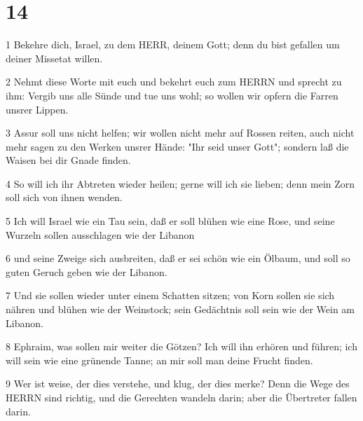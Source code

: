 \chapter{14}

\par 1 Bekehre dich, Israel, zu dem HERR, deinem Gott; denn du bist gefallen um deiner Missetat willen.
\par 2 Nehmt diese Worte mit euch und bekehrt euch zum HERRN und sprecht zu ihm: Vergib uns alle Sünde und tue uns wohl; so wollen wir opfern die Farren unsrer Lippen.
\par 3 Assur soll uns nicht helfen; wir wollen nicht mehr auf Rossen reiten, auch nicht mehr sagen zu den Werken unsrer Hände: "Ihr seid unser Gott"; sondern laß die Waisen bei dir Gnade finden.
\par 4 So will ich ihr Abtreten wieder heilen; gerne will ich sie lieben; denn mein Zorn soll sich von ihnen wenden.
\par 5 Ich will Israel wie ein Tau sein, daß er soll blühen wie eine Rose, und seine Wurzeln sollen ausschlagen wie der Libanon
\par 6 und seine Zweige sich ausbreiten, daß er sei schön wie ein Ölbaum, und soll so guten Geruch geben wie der Libanon.
\par 7 Und sie sollen wieder unter einem Schatten sitzen; von Korn sollen sie sich nähren und blühen wie der Weinstock; sein Gedächtnis soll sein wie der Wein am Libanon.
\par 8 Ephraim, was sollen mir weiter die Götzen? Ich will ihn erhören und führen; ich will sein wie eine grünende Tanne; an mir soll man deine Frucht finden.
\par 9 Wer ist weise, der dies verstehe, und klug, der dies merke? Denn die Wege des HERRN sind richtig, und die Gerechten wandeln darin; aber die Übertreter fallen darin.


